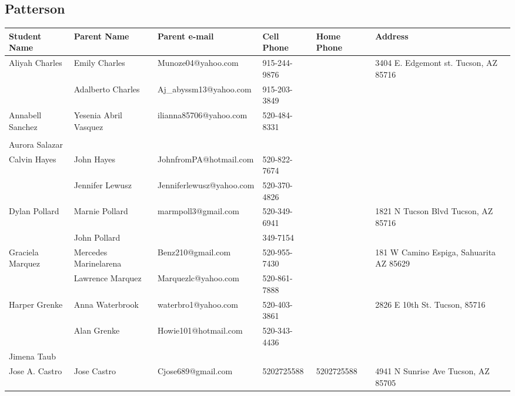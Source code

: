 \documentclass[landscape]{article}\usepackage[]{graphicx}\usepackage[]{color}
\begin{document}
\subsection{Patterson}
\begin{longtable}{|p{100pt}|p{100pt}|p{140pt}|p{60pt}|p{64pt}|p{120pt}|}
\textbf{Student Name} & \textbf{Parent Name} & \textbf{Parent e-mail} & \textbf{Cell Phone} & \textbf{Home Phone} & \textbf{Address}\\
\hline
\hline
\multirow{2}{100pt}{Aliyah Charles} & Emily Charles  & Munoze04@yahoo.com & 915-244-9876 &  & \multirow{2}{120pt}{3404 E. Edgemont st. Tucson, AZ 85716} \\
 & Adalberto Charles & Aj\_abyssm13@yahoo.com & 915-203-3849 &  & \\
\hline
\multirow{2}{100pt}{Annabell Sanchez} & Yesenia Abril Vasquez & ilianna85706@yahoo.com & 520-484-8331 &  & \multirow{2}{120pt}{} \\
 &  &  &  &  & \\
\hline
\multirow{2}{100pt}{Aurora Salazar} &  &  &  &  & \multirow{2}{120pt}{} \\
 &  &  &  &  & \\
\hline
\multirow{2}{100pt}{Calvin Hayes} & John Hayes & JohnfromPA@hotmail.com & 520-822-7674 &  & \multirow{2}{120pt}{} \\
 & Jennifer Lewusz & Jenniferlewusz@yahoo.com & 520-370-4826 &  & \\
\hline
\multirow{2}{100pt}{Dylan Pollard} & Marnie Pollard & marmpoll3@gmail.com & 520-349-6941 &  & \multirow{2}{120pt}{1821 N Tucson Blvd Tucson, AZ 85716} \\
 & John Pollard &  & 349-7154 &  & \\
\hline
\multirow{2}{100pt}{Graciela Marquez} & Mercedes Marinelarena  & Benz210@gmail.com & 520-955-7430 &  & \multirow{2}{120pt}{181 W Camino Espiga, Sahuarita AZ 85629} \\
 & Lawrence Marquez & Marquezlc@yahoo.com & 520-861-7888 &  & \\
\hline
\multirow{2}{100pt}{Harper Grenke} & Anna Waterbrook & waterbro1@yahoo.com & 520-403-3861 &  & \multirow{2}{120pt}{2826 E 10th St. Tucson, 85716} \\
 & Alan Grenke & Howie101@hotmail.com & 520-343-4436 &  & \\
\hline
\multirow{2}{100pt}{Jimena Taub} &  &  &  &  & \multirow{2}{120pt}{} \\
 &  &  &  &  & \\
\hline
\multirow{2}{100pt}{Jose A. Castro} & Jose Castro & Cjose689@gmail.com & 5202725588 & 5202725588 & \multirow{2}{120pt}{4941 N Sunrise Ave Tucson, AZ 85705} \\

\end{longtable}
\end{document}
